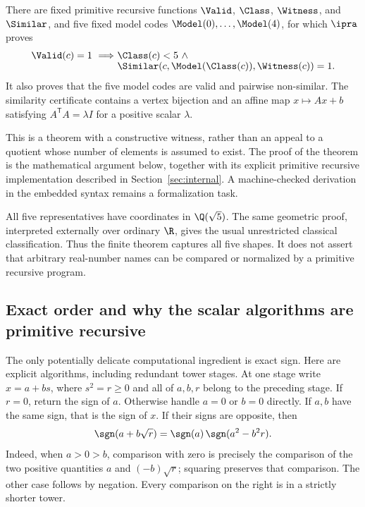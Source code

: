 \begin{theorem}\label{thm:main}
There are fixed primitive recursive functions $\Valid$, $\Class$, $\Witness$,
and $\Similar$, and five fixed model codes $\Model(0),\ldots,\Model(4)$,
for which $\ipra$ proves
\begin{align*}
 \Valid(c)=1\ \Longrightarrow\ &\Class(c)<5\ \wedge\\[-4pt]
 &\Similar(c,\Model(\Class(c)),\Witness(c))=1.
\end{align*}
It also proves that the five model codes are valid and pairwise
non-similar. The similarity certificate contains a vertex bijection
and an affine map $x\mapsto Ax+b$ satisfying
$A^{\mathsf T}A=\lambda I$ for a positive scalar $\lambda$.
\end{theorem}

This is a theorem with a constructive witness, rather than an appeal to
a quotient whose number of elements is assumed to exist. The proof of
the theorem is the mathematical argument below, together with its
explicit primitive recursive implementation described in
Section~\ref{sec:internal}. A machine-checked derivation in the embedded
syntax remains a formalization task.

\begin{remark}
All five representatives have coordinates in $\Q(\sqrt5)$. The same
geometric proof, interpreted externally over ordinary $\R$, gives the
usual unrestricted classical classification. Thus the finite theorem
captures all five shapes. It does not assert that arbitrary real-number
names can be compared or normalized by a primitive recursive program.
\end{remark}

\subsection{Exact order and why the scalar algorithms are primitive recursive}

The only potentially delicate computational ingredient is exact sign.
Here are explicit algorithms, including redundant tower stages.
At one stage write $x=a+bs$, where $s^2=r\geq0$ and all of $a,b,r$
belong to the preceding stage. If $r=0$, return the sign of $a$.
Otherwise handle $a=0$ or $b=0$ directly. If $a,b$ have the same sign,
that is the sign of $x$. If their signs are opposite, then
\begin{equation}\label{eq:towersign}
 \sgn(a+b\sqrt r)=\sgn(a)\,\sgn(a^2-b^2r).
\end{equation}
Indeed, when $a>0>b$, comparison with zero is precisely the comparison
of the two positive quantities $a$ and $(-b)\sqrt r$; squaring preserves
that comparison. The other case follows by negation. Every comparison
on the right is in a strictly shorter tower.


